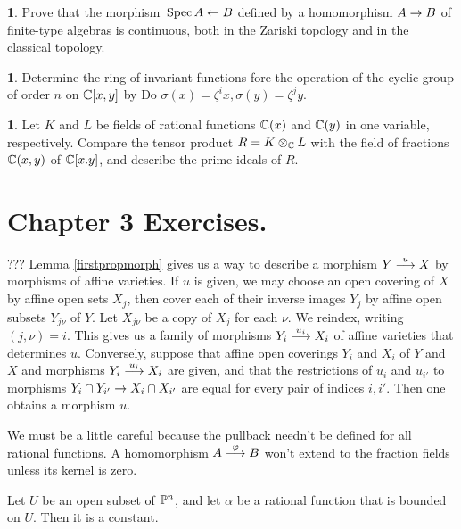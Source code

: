 \documentclass[leqno]{book}
\newcommand\Marginnote[1]{\marginnote{\hspace{-12pt}\normalfont{#1}}}
\theoremstyle{definition}%
\numberwithin{equation}{section}
\newtheorem{thm}[equation]{}
\theoremstyle{theorem} %
\begin{document}
\msno \begin{thm}
\Marginnote{morhicontinx}\label{morhicontinx}
  Prove that the morphism
$\,\operatorname{Spec} A \leftarrow B$ defined by a homomorphism $A \rightarrow B$ of
finite-type algebras is continuous, both in the Zariski topology and
in the classical topology.\end{thm}

\msno \begin{thm} \Marginnote{acctonplanex}\label{acctonplanex}
  Determine the ring of invariant functions fore the operation of the
  cyclic group of order $n$ on $\mathbb{C}[x,y]$ by Do $\sigma(x) =
  \zeta^ix, \sigma(y)= \zeta^j y$.\end{thm}


\msno \begin{thm} \Marginnote{exffld}\label{exffld} Let $K$ and $L$ be
  fields of rational functions $\mathbb{C}(x)$ and $\mathbb{C}(y)$ in one
  variable, respectively.  Compare the tensor product $R= K\otimes_{\mathbb{C}}
  L$ with the field of fractions $\mathbb{C}(x,y)$ of $\mathbb{C}[x.y]$, and
  describe the prime ideals of $R$.
\end{thm}

\newpage

\section{Chapter 3 Exercises.}

\ms
??? Lemma \ref{firstpropmorph} gives us a way to describe a morphism
$Y \stackrel u {\longrightarrow} X$ by morphisms of affine varieties.  If $u$ is
given, we may choose an open covering of $X$ by affine open sets
$X_j$, then cover each of their inverse images $Y_j$ by affine open
subsets $Y_{j\nu}$ of $Y$.  Let $X_{j\nu}$ be a copy of $X_j$ for each
$\nu$.  We reindex, writing $(j,\nu) = i$.  This
gives us a family of morphisms $Y_i\stackrel{u_i}{\longrightarrow} X_i$ of affine
varieties that determines $u$.  Conversely, suppose that affine open
coverings $Y_i$ and $X_i$ of $Y$ and $X$ and morphisms $Y_i\stackrel
{u_i}{\longrightarrow} X_i$ are given, and that the restrictions of $u_i$ and
$u_{i'}$ to morphisms $Y_i\cap Y_{i'} \rightarrow X_i\cap X_{i'}$ are equal
for every pair of indices $i,i'$.  Then one obtains a morphism $u$.


  We must be a little
careful because the pullback needn't be defined for all rational
functions.  A homomorphism $A\stackrel \varphi{\longrightarrow}
B$ won't extend to the fraction fields
unless its kernel is zero.


\ms
Let $U$ be an open subset of $\mathbb{P}^n$, and let $\alpha$ be a rational
function that is bounded on $U$.  Then it is
a constant.
\end{document}

